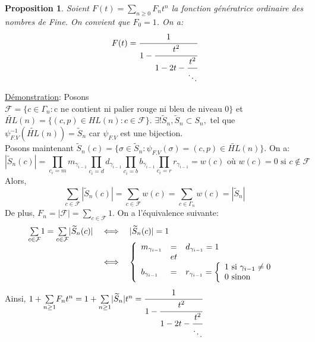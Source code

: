 \documentclass[12pt,a4paper]{extreport}
\newtheorem{proposition}{Proposition}[chapter]
\begin{document}
	\begin{proposition}
		Soient $F(t) = \underset{n \geq 0}{\sum}F_{n}t^n$ la fonction génératrice ordinaire des nombres de Fine. On convient que $F_{0}=1$. On a:
		\[
			F(t) = \cfrac{1}{1 - \cfrac{t^2}{1 - 2t - \cfrac{t^2}{\ddots}}}
		\]
	\end{proposition}
	\underline{Démonstration}:
		Posons $ \mathcal{F} = \{ c \in \Gamma_{n} : \text{c ne contient ni palier rouge ni bleu de niveau 0}  \} $ et $\widetilde{HL}(n)= \{ (c,p) \in HL(n) : c \in \mathcal{F} \}$. $\exists!\widetilde{S}_{n}, \widetilde{S}_{n}\subset S_{n},$ tel que $\psi^{-1}_{F.V}(\widetilde{HL}(n)) =  \widetilde{S}_{n}$ car $ \psi_{F.V} $ est une bijection.\\
		Posons maintenant $ \widetilde{S}_{n}(c) = \{ \sigma \in \widetilde{S}_{n}: \psi_{F.V}(\sigma)=(c,p) \in \widetilde{HL}(n) \} $. On a: 
		\[
			|\widetilde{S}_{n}(c)| = \underset{c_{i}=m}{\prod}m_{\gamma_{i-1}} \underset{c_{i}=d}{\prod}d_{\gamma_{i-1}} \underset{c_{i}=b}{\prod}b_{\gamma_{i-1}} \underset{c_{i}=r}{\prod}r_{\gamma_{i-1}} = w(c) \text{ où } w(c)=0 \text{ si } c\notin \mathcal{F}
		\]
		Alors, 
		\[
			\underset{c \in \mathcal{F}}{\sum} |\widetilde{S}_{n}(c)| = \underset{c \in \mathcal{F}}{\sum}w(c) =  \underset{c \in \Gamma_{n}}{\sum}w(c) = |\widetilde{S}_{n}|
		\]
		De plus, $F_{n} = |\mathcal{F}| = \underset{c \in \mathcal{F}}{\sum}1$. On a l'équivalence suivante: 
		\[
		\begin{array} {l l l}
			\underset{c\in \mathcal{F}}{\sum}1 = \underset{c \in \mathcal{F}}{\sum} |\widetilde{S}_{n}(c)| &\iff& |\widetilde{S}_{n}(c)| = 1\\
			&\iff& \left\{ \begin{array}{l l l}
								m_{\gamma_{i-1}} &= & d_{\gamma_{i-1}} = 1\\
												 &et&\\
								 b_{\gamma_{i-1}} &=& r_{\gamma_{i-1}} = \left\{ \begin{array}														{l l l}
								 												1 \text{ si } \gamma_{i-1} \neq 0\\
								 												0 \text{ sinon }
								 												\end{array} \right.

							\end{array}
					\right.

		\end{array}
		\]
		Ainsi, $1 + \underset{n \geq 1}{\sum}F_{n}t^{n} = 1+\underset{n \geq 1 }{\sum}|\widetilde{S}_{n}|t^{n} = \cfrac{1}{1 - \cfrac{t^2}{1 - 2t - \cfrac{t^2}{\ddots}}}$
\end{document}
